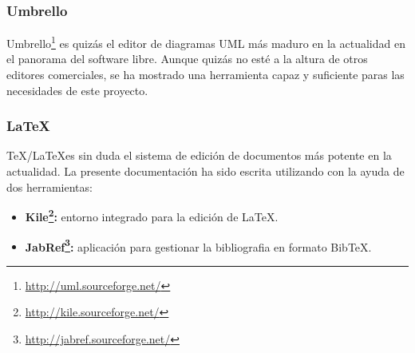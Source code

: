 \subsubsection{Umbrello}

Umbrello\footnote{\url{http://uml.sourceforge.net/}} es quizás el editor de
diagramas UML más maduro en la actualidad en el panorama del software libre.
Aunque quizás no esté a la altura de otros editores comerciales, se ha mostrado
una herramienta capaz y suficiente paras las necesidades de este proyecto.

\subsubsection{\LaTeX}

\TeX/\LaTeX es sin duda el sistema de edición de documentos más potente en la
actualidad. La presente documentación ha sido escrita utilizando \LaTeXe con
la ayuda de dos herramientas:

\begin{itemize}
  \item \textbf{Kile\footnote{\url{http://kile.sourceforge.net/}}:} entorno
	integrado para la edición de \LaTeX.
  \item \textbf{JabRef\footnote{\url{http://jabref.sourceforge.net/}}:} aplicación
	para gestionar la bibliografia en formato BibTeX.
\end{itemize}


